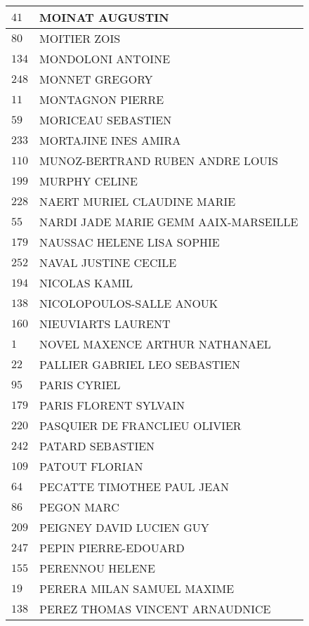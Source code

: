 \begin{xltabular}{\linewidth}{|l|X|}
    \hline
    $41$ & MOINAT AUGUSTIN \\
    \hline
    $80$ & MOITIER ZOIS \\
    \hline
    $134$ & MONDOLONI ANTOINE \\
    \hline
    $248$ & MONNET GREGORY \\
    \hline
    $11$ & MONTAGNON PIERRE \\
    \hline
    $59$ & MORICEAU SEBASTIEN \\
    \hline
    $233$ & MORTAJINE INES AMIRA \\
    \hline
    $110$ & MUNOZ-BERTRAND RUBEN ANDRE LOUIS \\
    \hline
    $199$ & MURPHY CELINE \\
    \hline
    $228$ & NAERT MURIEL CLAUDINE MARIE \\
    \hline
    $55$ & NARDI JADE MARIE GEMM AAIX-MARSEILLE \\
    \hline
    $179$ & NAUSSAC HELENE LISA SOPHIE \\
    \hline
    $252$ & NAVAL JUSTINE CECILE \\
    \hline
    $194$ & NICOLAS KAMIL \\
    \hline
    $138$ & NICOLOPOULOS-SALLE ANOUK \\
    \hline
    $160$ & NIEUVIARTS LAURENT \\
    \hline
    $1$ & NOVEL MAXENCE ARTHUR NATHANAEL \\
    \hline
    $22$ & PALLIER GABRIEL LEO SEBASTIEN \\
    \hline
    $95$ & PARIS CYRIEL \\
    \hline
    $179$ & PARIS FLORENT SYLVAIN \\
    \hline
    $220$ & PASQUIER DE FRANCLIEU OLIVIER \\
    \hline
    $242$ & PATARD SEBASTIEN \\
    \hline
    $109$ & PATOUT FLORIAN \\
    \hline
    $64$ & PECATTE TIMOTHEE PAUL JEAN \\
    \hline
    $86$ & PEGON MARC \\
    \hline
    $209$ & PEIGNEY DAVID LUCIEN GUY \\
    \hline
    $247$ & PEPIN PIERRE-EDOUARD \\
    \hline
    $155$ & PERENNOU HELENE \\
    \hline
    $19$ & PERERA MILAN SAMUEL MAXIME \\
    \hline
    $138$ & PEREZ THOMAS VINCENT ARNAUDNICE \\

\end{xltabular}

